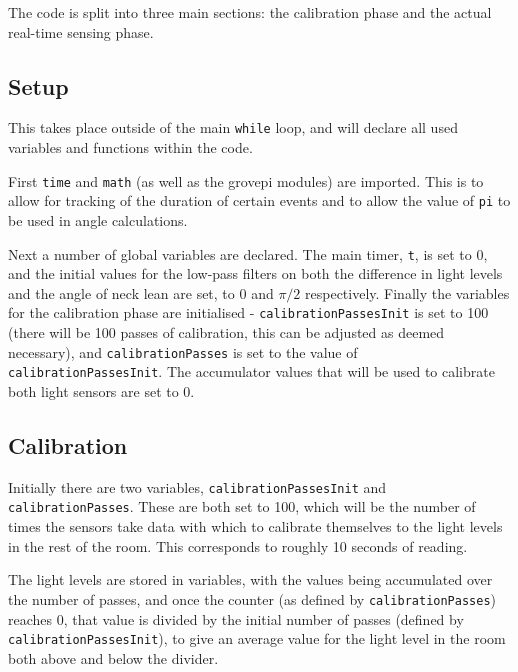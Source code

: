 \documentclass[12pt, a4paper]{report}
\begin{document}
\par

The code is split into three main sections: the calibration phase and the actual real-time sensing phase.

\subsection{Setup}

This takes place outside of the main \verb|while| loop, and will declare all used variables and functions within the code.

First \verb|time| and \verb|math| (as well as the grovepi modules) are imported.
This is to allow for tracking of the duration of certain events and to allow the value of \verb|pi| to be used in angle calculations.

\par

Next a number of global variables are declared.
The main timer, \verb|t|, is set to 0, and the initial values for the low-pass filters on both the difference in light levels and the angle of neck lean are set, to 0 and $\pi/2$ respectively.
Finally the variables for the calibration phase are initialised - \verb|calibrationPassesInit| is set to 100 (there will be 100 passes of calibration, this can be adjusted as deemed necessary), and \verb|calibrationPasses| is set to the value of \verb|calibrationPassesInit|.
The accumulator values that will be used to calibrate both light sensors are set to 0.



\subsection{Calibration}

Initially there are two variables, \verb|calibrationPassesInit| and \verb|calibrationPasses|.
These are both set to 100, which will be the number of times the sensors take data with which to calibrate themselves to the light levels in the rest of the room.
This corresponds to roughly 10 seconds of reading.

\par

The light levels are stored in variables, with the values being accumulated over the number of passes, and once the counter (as defined by \verb|calibrationPasses|) reaches 0, that value is divided by the initial number of passes (defined by \verb|calibrationPassesInit|), to give an average value for the light level in the room both above and below the divider.
\end{document}
